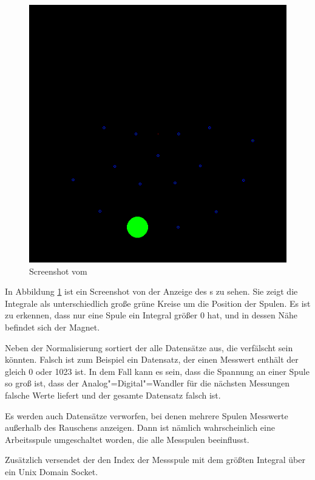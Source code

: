 \begin{figure}[hbt]
  \centering
  \includegraphics[width=\textwidth]{images/tracker.png}
  \caption{Screenshot vom }
  \label{fig:screentracker}
\end{figure}

In Abbildung \ref{fig:screentracker} ist ein Screenshot von der Anzeige des s zu sehen.
Sie zeigt die Integrale als unterschiedlich große grüne Kreise um die Position der Spulen.
Es ist zu erkennen, dass nur eine Spule ein Integral größer 0 hat, und in dessen Nähe befindet sich der Magnet.

Neben der Normalisierung sortiert der  alle Datensätze aus, die verfälscht sein könnten.
Falsch ist zum Beispiel ein Datensatz, der einen Messwert enthält der gleich 0 oder 1023 ist. In dem Fall kann es sein, dass die Spannung an einer Spule so groß ist, dass der Analog"=Digital"=Wandler für die nächsten Messungen falsche Werte liefert und der gesamte Datensatz falsch ist.

Es werden auch Datensätze verworfen, bei denen mehrere Spulen Messwerte außerhalb des Rauschens anzeigen.
Dann ist nämlich wahrscheinlich eine Arbeitsspule umgeschaltet worden, die alle Messpulen beeinflusst.

Zusätzlich versendet der  den Index der Messspule mit dem größten Integral über ein Unix Domain Socket.


